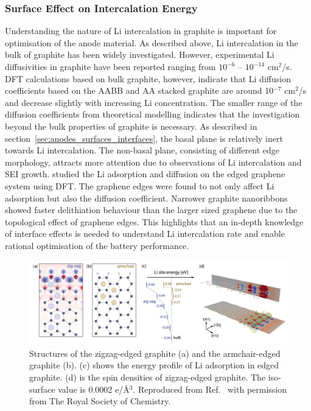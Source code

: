 \documentclass[../main.tex]{subfiles}
\begin{document}
\subsubsection{Surface Effect on Intercalation Energy} 
Understanding the nature of Li intercalation in graphite is important for optimisation of the anode material. As described above, Li intercalation in the bulk of graphite has been widely investigated.\cite{persson2010,toyoura2008first,toyoura2010effects,yao2012diffusion,thinius2014theoretical} However, experimental Li diffusivities in graphite have been reported ranging from $10^{-6}$ -- $10^{-14}$ cm$^2$/s.\cite{toyoura2010effects,takami1995structural,yang2004evaluation,yu1999determination} DFT calculations\cite{persson2010} based on bulk graphite, however, indicate that Li diffusion coefficients based on the AABB and AA stacked graphite are around 10$^{-7}$ cm$^2$/s and decrease slightly with increasing Li concentration.\cite{persson2010} The smaller range of the diffusion coefficients from theoretical modelling indicates that the investigation beyond the bulk properties of graphite is necessary. As described in section~\ref{sec:anodes_surfaces_interfaces}, the basal plane is relatively inert towards Li intercalation.\cite{persson2010lithium} The non-basal plane, consisting of different edge morphology, attracts more attention due to observations of Li intercalation and SEI growth.\cite{liu2019situ,zhang2020operando} \citeauthor{uthaisar2010edge} studied the Li adsorption and diffusion on the edged graphene system using DFT.\cite{uthaisar2010edge} The graphene edges were found to not only affect Li adsorption but also the diffusion coefficient. Narrower graphite nanoribbons showed faster delithiation behaviour than the larger sized graphene due to the topological effect of graphene edges. This highlights that an in-depth knowledge of interface effects is needed to understand Li intercalation rate and enable rational optimisation of the battery performance.

\begin{figure}
    \centering
    \includegraphics[scale=0.6]{figures/Intercalation energies.PNG}
    \caption{Structures of the zigzag-edged graphite (a) and the armchair-edged graphite (b). (c) shows the energy profile of Li adsorption in edged graphite. (d) is the spin densities of zigzag-edged graphite. The iso-surface value is 0.0002 e/\AA$^3$. Reproduced from Ref.~ with permission from The Royal Society of Chemistry.}
    \label{fig:arm_zig}
\end{figure}
\end{document}
